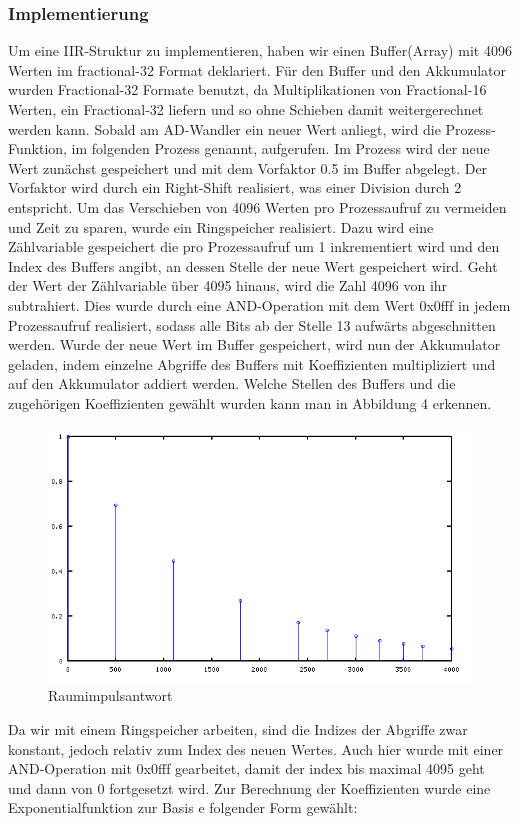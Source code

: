 \documentclass[a4paper,12pt,fontsize=12,DIV=12]{scrartcl}
\begin{document}
\subsubsection{Implementierung}
Um eine IIR-Struktur zu implementieren, haben wir einen Buffer(Array) mit 4096 Werten im fractional-32 Format deklariert. Für den Buffer und den Akkumulator wurden Fractional-32 Formate benutzt, da Multiplikationen von Fractional-16 Werten, ein Fractional-32 liefern und so ohne Schieben damit weitergerechnet werden kann.
Sobald am AD-Wandler ein neuer Wert anliegt, wird die Prozess-Funktion, im folgenden Prozess genannt, aufgerufen. Im Prozess wird der neue Wert zunächst gespeichert und mit dem Vorfaktor 0.5 im Buffer abgelegt. Der Vorfaktor wird durch ein Right-Shift realisiert, was einer Division durch 2 entspricht. Um das Verschieben von 4096 Werten pro Prozessaufruf zu vermeiden und Zeit zu sparen, wurde ein Ringspeicher realisiert. Dazu wird eine Zählvariable gespeichert die pro Prozessaufruf um 1 inkrementiert wird und den Index des Buffers angibt, an dessen Stelle der neue Wert gespeichert wird. Geht der Wert der Zählvariable über 4095 hinaus, wird die Zahl 4096 von ihr subtrahiert. Dies wurde durch eine AND-Operation mit dem Wert 0x0fff in jedem Prozessaufruf realisiert, sodass alle Bits ab der Stelle 13  aufwärts abgeschnitten werden.
Wurde der neue Wert im Buffer gespeichert, wird nun der Akkumulator geladen, indem einzelne Abgriffe des Buffers mit Koeffizienten multipliziert und auf den Akkumulator addiert werden. Welche Stellen des Buffers und die zugehörigen Koeffizienten gewählt wurden kann man in Abbildung 4 erkennen.
\begin{figure}[h]
	\includegraphics[scale=0.5]{Bilder/signalabgriffe.png}
	\caption{Raumimpulsantwort}
	\label{labelname}
\end{figure}
Da wir mit einem Ringspeicher arbeiten, sind die Indizes der Abgriffe zwar konstant, jedoch relativ zum Index des neuen Wertes. Auch hier wurde mit einer AND-Operation mit 0x0fff gearbeitet, damit der index bis maximal 4095 geht und dann von 0 fortgesetzt wird.
Zur Berechnung der Koeffizienten wurde eine Exponentialfunktion zur Basis e folgender Form gewählt:
\end{document}
